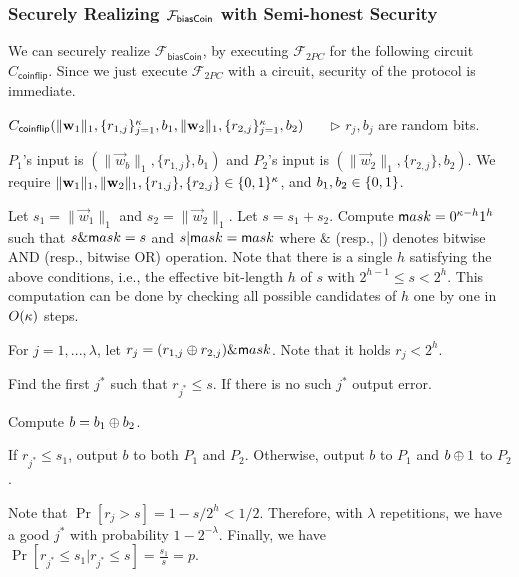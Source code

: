 \subsubsection{Securely Realizing $\mathcal{F}_{\mathsf{biasCoin}}$ with Semi-honest Security}
\label{apx:bcoin}

We can securely realize $\mathcal{F}_{\mathsf{biasCoin}}$, by executing $\mathcal{F}_{2PC}$ for the
following circuit $C_{\mathsf{coinflip}}$. Since we just execute $\mathcal{F}_{2PC}$ with
a circuit, security of the protocol is immediate. 
%
\BEN
\item[] \hspace{-2em} $C_{\mathsf{coinflip}}( \|\mathbf{w}_1\|_1,
\{r_{1,j}\}_{j=1}^\kappa, b_1, \|\mathbf{w}_2\|_1, \{ r_{2,j}
\}_{j=1}^\kappa, b_2)$   ~~~$\rhd$ $r_j, b_j$ are random bits. 
\item $P_1$'s input is $(\|\vec{w}_b\|_1, \{r_{1,j}\}, b_1)$ and $P_2$'s input
is $ (\|\vec{w}_2\|_1, \{r_{2,j}\}, b_2)$. We require $\|\mathbf{w}_1\|_1,
\|\mathbf{w}_2\|_1, \{r_{1,j}\}, \{r_{2,j}\} \in \{0,1\}^\kappa$, and $b_1, b_2 \in \{0,1\}$. 

\item Let $s_1 = \|\vec{w}_1\|_1$ and $s_2 = \|\vec{w}_2\|_1$.
Let $s = s_1 + s_2$. Compute ${\mathsf mask} = 0^{\kappa-h}1^h$ such that $s
\& {\mathsf mask} = s$ and $s | {\mathsf mask} = {\mathsf mask}$ where $\&$ (resp., $|$) denotes
bitwise AND (resp., bitwise OR) operation. Note that there is a single
$h$ satisfying the above conditions, i.e., the effective bit-length $h$
of $s$ with $2^{h-1} \le s < 2^h$. This computation can be done by
checking all possible candidates of $h$ one by one in $O(\kappa)$
steps.

\item For $j = 1,...,\lambda$, let $r_j = (r_{1,j} \oplus r_{2,j}) \&
{\mathsf mask}$. Note that it holds $r_j < 2^h$.

\item Find the first $j^*$ such that $r_{j^*} \le s$.  If there is no such
$j^*$ output error.

\item Compute $b = b_1 \oplus b_2$. 

\item If $r_{j^*} \le s_1$, output $b$ to both $P_1$ and $P_2$. 
  Otherwise, output $b$ to $P_1$ and $b \oplus 1$ to $P_2$. 
\EEN

Note that $\Pr[r_j > s] = 1 - s/2^{h}  < 1/2.$ Therefore, with
$\lambda$ repetitions, we have a good $j^*$ with probability
$1-2^{-\lambda}$. 
%
Finally, we have $\Pr[r_{j^*} \le s_1| r_{j^*} \le s] = \frac {s_1}{s} =
p$. 




